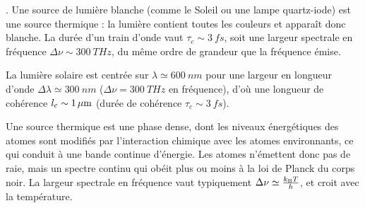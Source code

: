 \documentclass[12pt,fancy]{cours}
\begin{document}
\begin{liste}
\item {}.
Une source de lumière blanche (comme le Soleil ou une lampe quartz-iode) est une source thermique :  la lumière contient toutes les couleurs et apparaît donc blanche. La durée d'un train d'onde vaut $\tau_c \sim \SI{3}{fs}$, soit une largeur spectrale en fréquence $\Delta \nu \sim \SI{300}{THz}$, du même ordre de grandeur que la fréquence émise. 
\begin{remarque}
  
  La lumière solaire est centrée sur $\lambda\simeq\SI{600}{nm}$ pour une largeur en longueur d’onde $\Delta\lambda\simeq\SI{300}{nm}$ ($\Delta \nu = \SI{300}{THz}$ en fréquence), d'où une longueur de cohérence $l_{\rm{c}}\sim \SI{1}{\mu\meter}$ (durée de cohérence $\tau_c \sim \SI{3}{fs}$).
\end{remarque}
  \begin{remarque}
    Une source thermique est une phase dense, dont les niveaux énergétiques des atomes sont modifiés par l’interaction chimique avec les atomes environnants, ce qui conduit à une bande continue d’énergie. Les atomes n’émettent donc pas de raie, mais un spectre continu qui obéit plus ou moins à la loi de Planck du corps noir. La largeur spectrale en fréquence vaut typiquement $\Delta \nu \simeq \frac{k_{\rm B} T}{h}$, et croit avec la température.
\end{remarque}
\end{liste}
\end{document}
